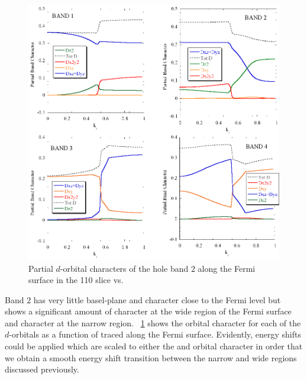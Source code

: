 \begin{figure}[htbp]
    \begin{center}
        \includegraphics[scale=0.65]{Chapter-dHvABaFe2P2/Figures/AngleDepMeasurements/BandCharacterVsKz/BandCharacterVsKz}
        \caption{Partial $d$-orbital characters of the hole band $2$ along the Fermi surface in the 110 slice vs. \kz}
        \label{Fig:ResD:Band2DCharacterVsKz}
    \end{center}
\end{figure}

Band $2$ has very little basel-plane \Dxy and \DxTwoyTwo character close to the Fermi level but shows a significant amount of \DzTwo character at the wide region of the Fermi surface and \DxzDyz character at the narrow region. \Fig~\ref{Fig:ResD:Band2DCharacterVsKz} shows the orbital character for each of the $d$-orbitals as a function of \kz traced along the Fermi surface. Evidently, energy shifts could be applied which are scaled to either the \DzTwo and \DxzDyz orbital character in order that we obtain a smooth energy shift transition between the narrow and wide regions discussed previously. 

